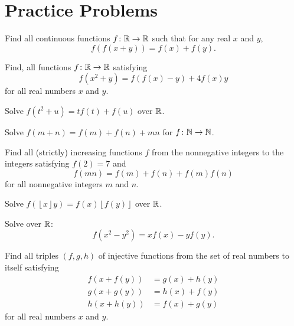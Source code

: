 \documentclass[11pt]{scrartcl}
\begin{document}
\eject

\section{Practice Problems}
\begin{problem}
  Find all continuous functions $f \colon \mathbb R \to \mathbb R$
  such that  for any real $x$ and $y$,
  \[ f(f(x+y)) = f(x) + f(y). \]
\end{problem}

\begin{problem}
  Find, all functions $f\colon \mathbb R \to \mathbb R$ satisfying
  \[ f(x^2+y) = f(f(x)-y) + 4f(x)y \]
  for all real numbers $x$ and $y$.
\end{problem}

\begin{problem}
  Solve $f(t^2+u) = tf(t) + f(u)$ over $\mathbb R$.
  \label{pr:finish_up}
\end{problem}

\begin{problem}
  Solve $f(m+n)=f(m)+f(n)+mn$ for $f \colon \mathbb N \to \mathbb N$.
\end{problem}

\begin{problem}
  Find all (strictly) increasing functions $f$ from the nonnegative integers
  to the integers satisfying $f(2)=7$ and \[ f(mn) = f(m) + f(n) + f(m)f(n) \]
  for all nonnegative integers $m$ and $n$.
\end{problem}

\begin{problem}
  [IMO 2010/1]
  Solve $f(\left\lfloor x\right\rfloor y)=f(x)\left\lfloor f(y)\right\rfloor$ over $\mathbb R$.
\end{problem}

\begin{problem}
  [USAMO 2002/4]
  Solve over $\mathbb R$: \[ f(x^2-y^2) = xf(x) - yf(y). \]
\end{problem}

\begin{problem}
  [ELMO 2014]
  Find all triples $(f,g,h)$ of injective functions from the set of real numbers to itself satisfying
  \begin{align*}
    f(x+f(y)) &= g(x) + h(y) \\
    g(x+g(y)) &= h(x) + f(y) \\
    h(x+h(y)) &= f(x) + g(y)
  \end{align*}
  for all real numbers $x$ and $y$.
\end{problem}
\end{document}
